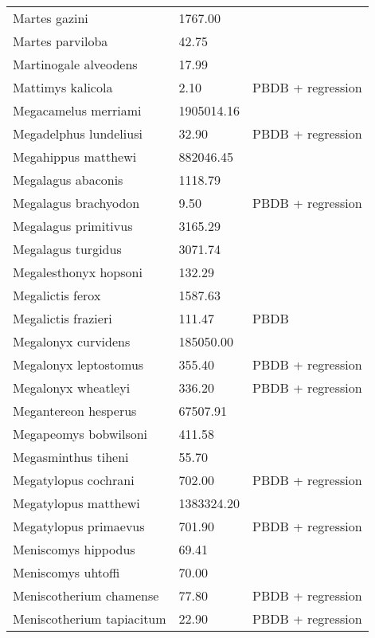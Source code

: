 \documentclass{article}
\begin{document}
\begin{center}
\begin{longtable}{p{} p{} p{}}
    Martes gazini & 1767.00 & \cite{McKenna2011} \\ 
    Martes parviloba & 42.75 & \cite{Macdonald1951} \\ 
    Martinogale alveodens & 17.99 & \cite{Tomiya2013} \\ 
    Mattimys kalicola & 2.10 & PBDB + regression \\ 
    Megacamelus merriami & 1905014.16 & \cite{Tomiya2013} \\ 
    Megadelphus lundeliusi & 32.90 & PBDB + regression \\ 
    Megahippus matthewi & 882046.45 & \cite{Tomiya2013} \\ 
    Megalagus abaconis & 1118.79 & \cite{Tomiya2013} \\ 
    Megalagus brachyodon & 9.50 & PBDB + regression \\ 
    Megalagus primitivus & 3165.29 & \cite{Tomiya2013} \\ 
    Megalagus turgidus & 3071.74 & \cite{Tomiya2013} \\ 
    Megalesthonyx hopsoni & 132.29 & \cite{Hay1916} \\ 
    Megalictis ferox & 1587.63 & \cite{Tomiya2013} \\ 
    Megalictis frazieri & 111.47 & PBDB \\ 
    Megalonyx curvidens & 185050.00 & \cite{McDonald2005} \\ 
    Megalonyx leptostomus & 355.40 & PBDB + regression \\ 
    Megalonyx wheatleyi & 336.20 & PBDB + regression \\ 
    Megantereon hesperus & 67507.91 & \cite{Tomiya2013} \\ 
    Megapeomys bobwilsoni & 411.58 & \cite{Tomiya2013} \\ 
    Megasminthus tiheni & 55.70 & \cite{Tomiya2013} \\ 
    Megatylopus cochrani & 702.00 & PBDB + regression \\ 
    Megatylopus matthewi & 1383324.20 & \cite{Tomiya2013} \\ 
    Megatylopus primaevus & 701.90 & PBDB + regression \\ 
    Meniscomys hippodus & 69.41 & \cite{Tomiya2013} \\ 
    Meniscomys uhtoffi & 70.00 & \cite{McKenna2011} \\ 
    Meniscotherium chamense & 77.80 & PBDB + regression \\ 
    Meniscotherium tapiacitum & 22.90 & PBDB + regression \\ 

\end{longtable}
\end{center}
\end{document}
